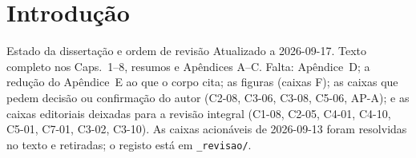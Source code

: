 
\chapter{Introdução}
\label{cha:introducao}
{Estado da dissertação e ordem de revisão}
{Atualizado a 2026-09-17. Texto completo nos Caps.~1--8, resumos e
Apêndices A--C. Falta: Apêndice~D; a redução do Apêndice~E ao que o corpo
cita; as figuras (caixas F); as caixas que pedem decisão ou confirmação do
autor (C2-08, C3-06, C3-08, C5-06, AP-A); e as caixas editoriais deixadas
para a revisão integral (C1-08, C2-05, C4-01, C4-10, C5-01, C7-01, C3-02,
C3-10). As caixas acionáveis de 2026-09-13 foram resolvidas no texto e
retiradas; o registo está em \texttt{\_revisao/}.}%

